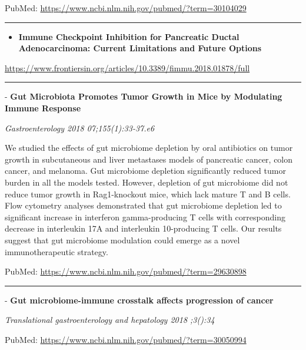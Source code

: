 \documentclass[]{article}
\providecommand{\tightlist}{%
  \setlength{\itemsep}{0pt}\setlength{\parskip}{0pt}}
\begin{document}
PubMed: \url{https://www.ncbi.nlm.nih.gov/pubmed/?term=30104029}

{}

{}

\begin{center}\rule{0.5\linewidth}{\linethickness}\end{center}

\begin{itemize}
\tightlist
\item
  \textbf{Immune Checkpoint Inhibition for Pancreatic Ductal
  Adenocarcinoma: Current Limitations and Future Options}
\end{itemize}

\url{https://www.frontiersin.org/articles/10.3389/fimmu.2018.01878/full}

\begin{center}\rule{0.5\linewidth}{\linethickness}\end{center}

 - \textbf{Gut Microbiota Promotes Tumor Growth in Mice by Modulating
Immune Response}

\emph{Gastroenterology 2018 07;155(1):33-37.e6}

We studied the effects of gut microbiome depletion by oral antibiotics
on tumor growth in subcutaneous and liver metastases models of
pancreatic cancer, colon cancer, and melanoma. Gut microbiome depletion
significantly reduced tumor burden in all the models tested. However,
depletion of gut microbiome did not reduce tumor growth in Rag1-knockout
mice, which lack mature T and B cells. Flow cytometry analyses
demonstrated that gut microbiome depletion led to significant increase
in interferon gamma-producing T cells with corresponding decrease in
interleukin 17A and interleukin 10-producing T cells. Our results
suggest that gut microbiome modulation could emerge as a novel
immunotherapeutic strategy.

PubMed: \url{https://www.ncbi.nlm.nih.gov/pubmed/?term=29630898}

{}

{}

\begin{center}\rule{0.5\linewidth}{\linethickness}\end{center}

 - \textbf{Gut microbiome-immune crosstalk affects progression of
cancer}

\emph{Translational gastroenterology and hepatology 2018 ;3():34}

PubMed: \url{https://www.ncbi.nlm.nih.gov/pubmed/?term=30050994}
\end{document}
